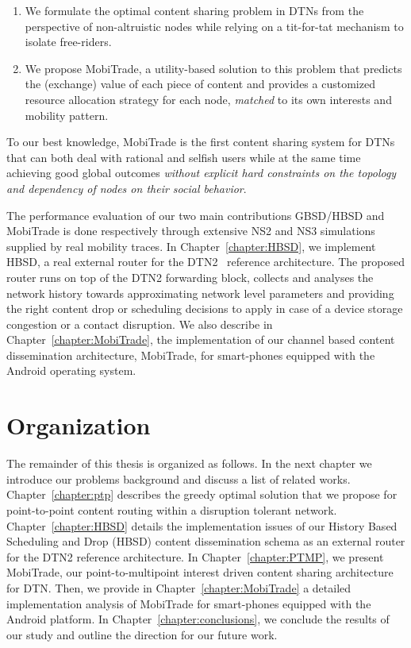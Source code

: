 \begin{enumerate}
    \item We formulate the optimal content sharing problem in DTNs from the perspective of non-altruistic nodes while relying on a tit-for-tat mechanism to isolate free-riders.
    \item We propose MobiTrade, a utility-based solution to this problem that predicts the (exchange) value of each piece of content and provides a customized resource allocation strategy for each node, \emph{matched} to its own interests and mobility pattern.
\end{enumerate}
To our best knowledge, MobiTrade is the first content sharing system for DTNs that can both deal with rational and selfish users while at the same time achieving good global outcomes \emph{without explicit hard constraints on the topology and dependency of nodes on their social behavior}. 

The performance evaluation of our two main contributions GBSD/HBSD and MobiTrade is done respectively through extensive NS2 and NS3 simulations supplied by real mobility traces. In Chapter~\ref{chapter:HBSD}, we implement HBSD, a real external router for the DTN2~\cite{HBSDDTN2} reference architecture. The proposed router runs on top of the DTN2 forwarding block, collects and analyses the network history towards approximating network level parameters and providing the right content drop or scheduling decisions to apply in case of a device storage congestion or a contact disruption. We also describe in Chapter~\ref{chapter:MobiTrade}, the implementation of our channel based content dissemination architecture, MobiTrade, for smart-phones equipped with the Android operating system. 

\section{Organization}

The remainder of this thesis is organized as follows. In the next chapter we introduce our problems background and discuss a list of related works. Chapter~\ref{chapter:ptp} describes the 
greedy optimal solution that we propose for point-to-point content routing within a disruption tolerant network. Chapter~\ref{chapter:HBSD} details the implementation issues of our History Based Scheduling and Drop (HBSD) content dissemination schema as an external router for the DTN2 reference architecture. In Chapter~\ref{chapter:PTMP}, we present MobiTrade, our point-to-multipoint interest driven content sharing architecture for DTN. Then, we provide in Chapter~\ref{chapter:MobiTrade} a detailed implementation analysis of MobiTrade for smart-phones equipped with the Android platform. In Chapter~\ref{chapter:conclusions}, we conclude the results of our study and outline the direction for our future work.
